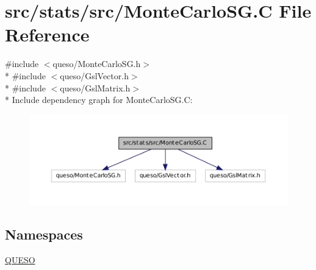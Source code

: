 \hypertarget{_monte_carlo_s_g_8_c}{\section{src/stats/src/\-Monte\-Carlo\-S\-G.C File Reference}
\label{_monte_carlo_s_g_8_c}
}
{\ttfamily \#include $<$queso/\-Monte\-Carlo\-S\-G.\-h$>$}\\*
{\ttfamily \#include $<$queso/\-Gsl\-Vector.\-h$>$}\\*
{\ttfamily \#include $<$queso/\-Gsl\-Matrix.\-h$>$}\\*
Include dependency graph for Monte\-Carlo\-S\-G.\-C\-:
\nopagebreak
\begin{figure}[H]
\begin{center}
\leavevmode
\includegraphics[width=350pt]{_monte_carlo_s_g_8_c__incl}
\end{center}
\end{figure}
\subsection*{Namespaces}
\begin{DoxyCompactItemize}
\item 
\hyperlink{namespace_q_u_e_s_o}{Q\-U\-E\-S\-O}
\end{DoxyCompactItemize}
